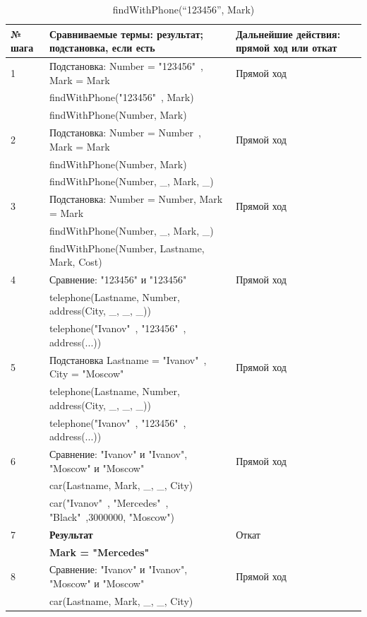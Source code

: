 {
\small
\begin{longtable}{|p{1.15cm}|p{8cm}|p{8cm}|}
    \caption{findWithPhone(``123456'', Mark)} \\
    \hline
    № шага & Сравниваемые термы: результат; подстановка, если есть & Дальнейшие действия: прямой ход или откат \\
    \hline
    1 & Подстановка: Number = "123456"\ , Mark = Mark & Прямой ход \\
        & findWithPhone("123456"\ , Mark) & \\
        & findWithPhone(Number, Mark) & \\
    \hline
    2 & Подстановка: Number = Number\ , Mark = Mark & Прямой ход \\
        & findWithPhone(Number, Mark) & \\
        & findWithPhone(Number, \_, Mark, \_) & \\
    \hline
    3 & Подстановка: Number = Number, Mark = Mark & Прямой ход \\
        & findWithPhone(Number, \_, Mark, \_) & \\
        & findWithPhone(Number, Lastname, Mark, Cost) & \\
    \hline
    4 & Сравнение: "123456" и "123456"& Прямой ход \\
        & telephone(Lastname, Number, address(City, \_, \_, \_)) & \\
        & telephone("Ivanov"\ , "123456"\ , address(...)) & \\
    \hline
    5 & Подстановка Lastname = "Ivanov"\ , City = "Moscow"& Прямой ход \\
        & telephone(Lastname, Number, address(City, \_, \_, \_)) & \\
        & telephone("Ivanov"\ , "123456"\ , address(...)) & \\
    \hline
    6 & Сравнение: "Ivanov" и "Ivanov", "Moscow" и "Moscow" & Прямой ход \\
        & car(Lastname, Mark, \_, \_, City) & \\
        & car("Ivanov"\ , "Mercedes"\ , "Black"\ ,3000000, "Moscow") & \\
    \hline
    7 & \textbf{Результат} & Откат \\
        & \textbf{Mark = "Mercedes"} & \\
    \hline
    8 & Сравнение: "Ivanov" и "Ivanov", "Moscow" и "Moscow" & Прямой ход \\
        & car(Lastname, Mark, \_, \_, City) & \\

\end{longtable}}
